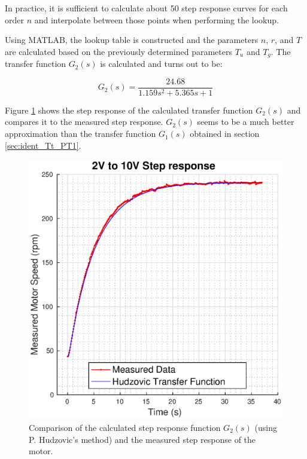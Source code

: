 In practice, it is sufficient to calculate about 50 step  response  curves for
each order  $n$  and  interpolate  between  those  points  when performing the
lookup.

Using MATLAB, the lookup table is constructed and the parameters $n$, $r$, and
$T$ are calculated based on  the  previously  determined  parameters $T_u$ and
$T_g$. The  transfer  function  $G_2(s)$  is  calculated  and turns out to be:

\begin{equation}
    G_2(s) = \frac{24.68}{1.159 s^2 + 5.365 s + 1}
\end{equation}

Figure  \ref{fig:hudzovic_step}  shows  the  step response of  the  calculated
transfer  function  $G_2(s)$  and  compares it to the measured step  response.
$G_2(s)$ seems to be a much better approximation  than  the  transfer function
$G_1(s)$ obtained in section \ref{sec:ident_Tt_PT1}.

\begin{figure}[t]
    \centering
    \includegraphics[width=\linewidth]{images/hudzovic}
    \caption{Comparison of the calculated step response function $G_2(s)$ (using P. Hudzovic's method) and the measured step response of the motor.}
    \label{fig:hudzovic_step}
\end{figure}

